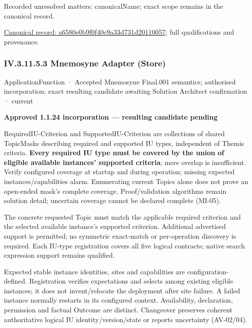 {\small Recorded unresolved matters: canonicalName; exact scope remains in the canonical record.}\par
{\footnotesize \href{../../../../continuum/application/application-function/a6580e0b9f0f40c9a33d731d20110057.md}{Canonical record: a6580e0b9f0f40c9a33d731d20110057}; full qualifications and provenance.}\par
\subsubsection*{IV.3.11.5.3 Mnemosyne Adapter (Store)}
\label{navigation:IV.3.11.5.3}

\label{element:9c680d56a6b943da8ff22f3264e19bc7}
{\small ApplicationFunction · Accepted Mnemosyne Final.001 semantics; authorised incorporation; exact resulting candidate awaiting Solution Architect confirmation · current}\par

\par\medskip\textbf{Approved 1.1.24 incorporation — resulting candidate pending}\par


RequiredIU-Criterion and SupportedIU-Criterion are collections of shared TopicMasks describing required and supported IU types, independent of Themis criteria. \textbf{Every required IU type must be covered by the union of eligible available instances' supported criteria}; mere overlap is insufficient. Verify configured coverage at startup and during operation; missing expected instances/capabilities alarm. Enumerating current Topics alone does not prove an open-ended mask's complete coverage. Proof/validation algorithms remain solution detail; uncertain coverage cannot be declared complete (MI-05).



The concrete requested Topic must match the applicable required criterion and the selected available instance's supported criterion. Additional advertised support is permitted; no symmetric exact-match or per-operation discovery is required. Each IU-type registration covers all five logical contracts; native search expression support remains qualified.



Expected stable instance identities, sites and capabilities are configuration-defined. Registration verifies expectations and selects among existing eligible instances; it does not invent/relocate the deployment after site failure. A failed instance normally restarts in its configured context. Availability, declaration, permission and factual Outcome are distinct. Changeover preserves coherent authoritative logical IU identity/version/state or reports uncertainty (AV-02/04).




